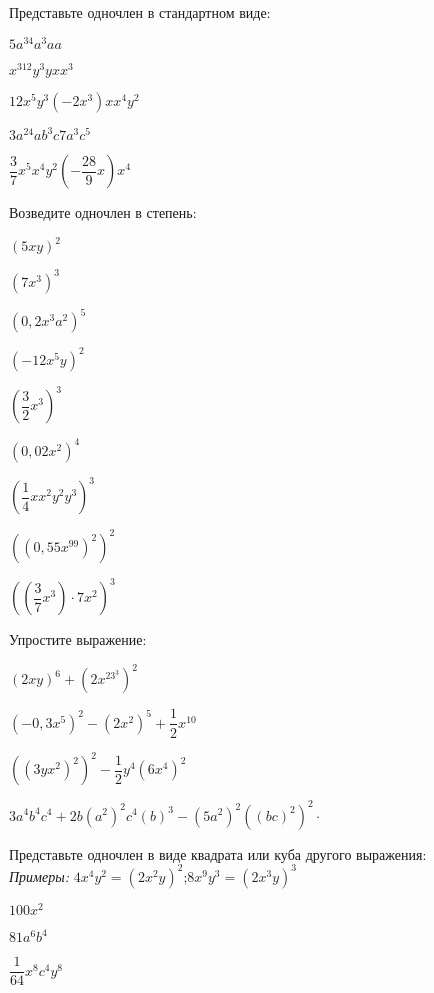 \begin{listofex}
	\item Представьте одночлен в стандартном виде:
	\begin{enumcols}[itemcolumns=3]
		\item \( 5a^34a^3aa \)
		\item \( x^312y^3yxx^3 \)
		\item \( 12x^5y^3(-2x^3)xx^4y^2 \)
		\item \( 3a^24ab^3c7a^3c^5 \)
		\item \( \dfrac{3}{7}x^5x^4y^2\left( -\dfrac{28}{9}x \right)x^4 \)
	\end{enumcols}
	\item Возведите одночлен в степень:
	\begin{enumcols}[itemcolumns=4]
		\item \( (5xy)^2 \)
		\item \( (7x^3)^3 \)
		\item \( (0,2x^3a^2)^5 \)
		\item \( (-12x^5y)^2 \)
		\item \( \left( \dfrac{3}{2}x^3 \right)^3 \)
		\item \( (0,02x^2)^4 \)
		\item \( \left( \dfrac{1}{4}xx^2y^2y^3 \right)^3 \)
		\item \( \left( (0,55x^99)^2 \right)^2 \)
		\item \( \left( \left( \dfrac{3}{7}x^3 \right)\cdot7x^2 \right)^3 \)
	\end{enumcols}
	\item Упростите выражение:
	\begin{enumcols}[itemcolumns=2]
		\item \( (2xy)^6+(2x^23^3)^2 \)
		\item \( (-0,3x^5)^2-(2x^2)^5+\dfrac{1}{2}x^{10} \)
		\item \( \left( (3yx^2)^2 \right)^2-\dfrac{1}{2}y^4\left( 6x^4 \right)^2 \)
		\item \( 3a^4b^4c^4+2b(a^2)^2c^4(b)^3-(5a^2)^2\left( (bc)^2 \right)^2\cdot \)
	\end{enumcols}
	\item Представьте одночлен в виде квадрата или куба другого выражения:\\
	\textit{Примеры:} \( 4x^4y^2=(2x^2y)^2 \);\quad\( 8x^9y^3=(2x^3y)^3 \)
	\begin{enumcols}[itemcolumns=4]
		\item \( 100x^2 \)
		\item \( 81a^6b^4 \)
		\item \( \dfrac{1}{64}x^{8}c^4y^{8} \)

\end{enumcols}
\end{listofex}
